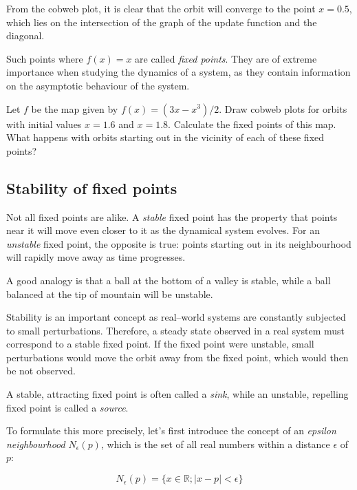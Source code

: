 From the cobweb plot, it is clear that the orbit will converge to the point $x=0.5$, which lies on the intersection of the graph of the update function and the diagonal.

Such points where $f(x)=x$ are called \emph{fixed points}. They are of extreme importance when studying the dynamics of a system, as they contain information on the asymptotic behaviour of the system.

\begin{sidebar}
\begin{ex}
Let $f$ be the map given by $f(x) = (3x-x^3)/2$. Draw cobweb plots for orbits with initial values $x=1.6$ and $x=1.8$. Calculate the fixed points of this map. What happens with orbits starting out in the vicinity of each of these fixed points?
\end{ex}
\end{sidebar}

\subsection{Stability of fixed points}

Not all fixed points are alike. A \emph{stable} fixed point has the property that points near it will move even closer to it as the dynamical system evolves. For an \emph{unstable} fixed point, the opposite is true: points starting out in its neighbourhood will rapidly move away as time progresses.

A good analogy is that a ball at the bottom of a valley is stable, while a ball balanced at the tip of mountain will be unstable.

Stability is an important concept as real--world systems are constantly subjected to small perturbations. Therefore, a steady state observed in a real system must correspond to a stable fixed point. If the fixed point were unstable, small perturbations would move the orbit away from the fixed point, which would then be not observed.

A stable, attracting fixed point is often called a \emph{sink}, while an unstable, repelling fixed point is called a \emph{source}.

To formulate this more precisely, let's first introduce the concept of an \emph{epsilon neighbourhood} $N_\epsilon(p)$, which is the set of all real numbers within a distance $\epsilon$ of $p$:

\begin{equation}
N_\epsilon(p) = \{x \in \mathbb{R} ; |x-p| < \epsilon\}
\end{equation} 

